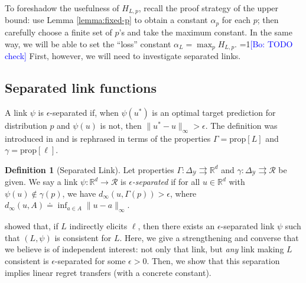 \documentclass{article}
\theoremstyle{definition}\newtheorem{definition}{Definition}
\theoremstyle{definition}\newtheorem{assumption}{Assumption}
\newcommand{\Comments}{1}
\newcommand{\mynote}[2]{\ifnum\Comments=1\textcolor{#1}{#2}\fi}
\newcommand{\bo}[1]{\mynote{blue}{[Bo: #1]}}
\newcommand{\reals}{\mathbb{R}}
\newcommand{\defeq}{\doteq}%
\newcommand{\prop}[1]{\mathrm{prop}[#1]}
\newcommand{\simplex}{\Delta_\Y}
\newcommand{\R}{\mathcal{R}}
\newcommand{\Y}{\mathcal{Y}}
\newcommand{\toto}{\rightrightarrows}
\begin{document}
To foreshadow the usefulness of $H_{L,p}$, recall the proof strategy of the upper bound: use Lemma \ref{lemma:fixed-p} to obtain a constant $\alpha_p$ for each $p$; then carefully choose a finite set of $p$'s and take the maximum constant.
In the same way, we will be able to set the ``loss'' constant $\alpha_L = \max_p H_{L,p}$. \bo{TODO check}
First, however, we will need to investigate separated links.

\subsection{Separated link functions}
A link $\psi$ is $\epsilon$-separated if, when $\psi(u^*)$ is an optimal target prediction for distribution $p$ and $\psi(u)$ is not, then $\|u^* - u\|_{\infty} > \epsilon$.
The definition was introduced in \cite{finocchiaro2020} and is rephrased in terms of the properties $\Gamma = \prop{L}$ and $\gamma = \prop{\ell}$.

\begin{definition}[Separated Link]\label{def:sep-link}
  Let properties $\Gamma:\simplex\toto\reals^d$ and $\gamma:\simplex\toto\R$ be given.
  We say a link $\psi:\reals^d\to\R$
  is \emph{$\epsilon$-separated} if for all $u\in\reals^d$ with $\psi(u)\notin\gamma(p)$, we have $d_\infty(u,\Gamma(p)) > \epsilon$, where $d_\infty(u,A) \defeq \inf_{a\in A} \|u-a\|_\infty$.
\end{definition}

\cite{finocchiaro2020} showed that, if $L$ indirectly elicits $\ell$, then there exists an $\epsilon$-separated link $\psi$ such that $(L,\psi)$ is consistent for $L$.
Here, we give a strengthening and converse that we believe is of independent interest: not only that link, but \emph{any} link making $L$ consistent is $\epsilon$-separated for some $\epsilon > 0$.
Then, we show that this separation implies linear regret transfers (with a concrete constant).
\end{document}
